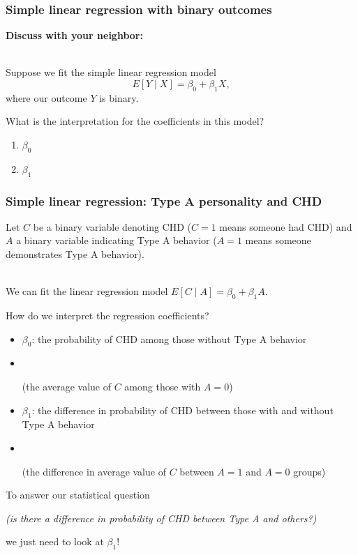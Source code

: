 \documentclass{beamer}
\begin{document}
\begin{frame}
	\frametitle{Simple linear regression with binary outcomes}
	\textbf{Discuss with your neighbor:} 
	\\ ~\ 
	
	Suppose we fit the simple linear regression model $$E[Y \mid X] = \beta_0 + \beta_1 X,$$ where our outcome $Y$ is binary.
	
	What is the interpretation for the coefficients in this model?
	
	\begin{enumerate}
			\item $\beta_0$
			\item $\beta_1$
		\end{enumerate} 
\end{frame}

\begin{frame}
	\frametitle{Simple linear regression: Type A personality and CHD}
	\vspace{-0.5cm}
	Let $C$ be a binary variable denoting CHD ($C = 1$ means someone had CHD) and $A$ a binary variable indicating Type A behavior ($A = 1$ means someone demonstrates Type A behavior).
	\\ ~\
	
	We can fit the linear regression model $E[C \mid A] = \beta_0 + \beta_1A $.
	
	How do we interpret the regression coefficients? \vspace{-0.2cm}
	
	\begin{itemize}
		\item \color{blue} $\beta_0$: \pause the probability of CHD among those without Type A behavior \pause \color{black}\vspace{-0.2cm}
		\item[] \ \ \begin{scriptsize} (the average value of $C$ among those with $A = 0$) \end{scriptsize} \pause
		\item \color{blue} $\beta_1$: \pause the difference in probability of CHD between those with and without Type A behavior \pause \color{black} \vspace{-0.2cm}
		\item[] \ \ \begin{scriptsize}(the difference in average value of $C$ between $A = 1$ and $A = 0$ groups) \pause \end{scriptsize}
	\end{itemize}
	
	\vspace{-0.2cm}
	To answer our statistical question \begin{small}\textit{(is there a difference in probability of CHD between Type A and others?)}\end{small} we just need to look at $\beta_1$!
\end{frame}
\end{document}
